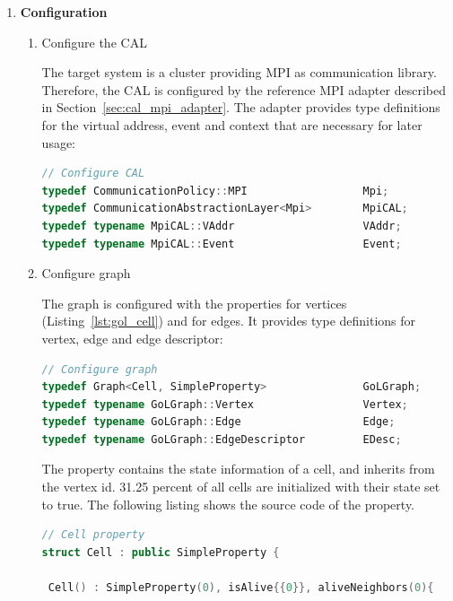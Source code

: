 \begin{enumerate}

\item \textbf{Configuration}
\begin{enumerate}

\item Configure the CAL
  
  The target system is a cluster providing MPI as communication
  library. Therefore, the CAL is configured by the reference MPI adapter
  described in Section~\ref{sec:cal_mpi_adapter}. The adapter provides
  type definitions for the virtual address, event and context that are
  necessary for later usage:

  \begin{lstlisting}[language=C++, label=lst:conf_cal, caption={}]
// Configure CAL
typedef CommunicationPolicy::MPI                  Mpi;
typedef CommunicationAbstractionLayer<Mpi>        MpiCAL;
typedef typename MpiCAL::VAddr                    VAddr;
typedef typename MpiCAL::Event                    Event;
  \end{lstlisting}

\item Configure graph

  The graph is configured with the properties  for vertices
  (Listing~\ref{lst:gol_cell}) and  for edges. It
  provides type definitions for vertex, edge and edge descriptor:

  \begin{lstlisting}[language=C++, label=lst:conf_graph, caption={}]
// Configure graph
typedef Graph<Cell, SimpleProperty>               GoLGraph;
typedef typename GoLGraph::Vertex                 Vertex;
typedef typename GoLGraph::Edge                   Edge;
typedef typename GoLGraph::EdgeDescriptor         EDesc;
  \end{lstlisting}

  The  property contains the state information of a cell, and
  inherits from  the vertex id. 31.25 percent of
  all cells are initialized with their state  set to true.  The
  following listing shows the source code of the  property.
  
  \begin{lstlisting}[language=C++, label=lst:gol_cell, caption={}]
// Cell property    
struct Cell : public SimpleProperty { 

 Cell() : SimpleProperty(0), isAlive{{0}}, aliveNeighbors(0){ 
          

\end{lstlisting}
\end{enumerate}
\end{enumerate}
